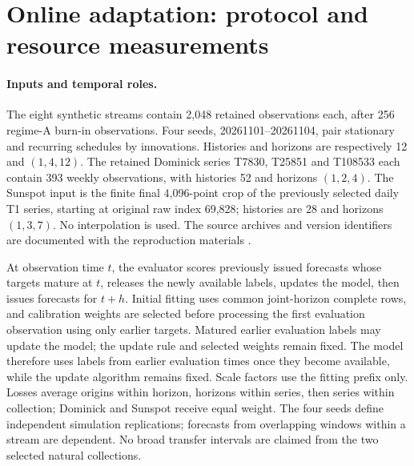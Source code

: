 \section{Online adaptation: protocol and resource measurements}
\label{app:adaptive-development}

\paragraph{Inputs and temporal roles.}
The eight synthetic streams contain 2,048 retained observations each, after
256 regime-A burn-in observations. Four seeds, 20261101--20261104, pair
stationary and recurring schedules by innovations. Histories and horizons
are respectively 12 and $(1,4,12)$. The retained Dominick series T7830,
T25851 and T108533 each contain 393 weekly observations, with histories 52
and horizons $(1,2,4)$. The Sunspot input is the finite final 4,096-point
crop of the previously selected daily T1 series, starting at original raw
index 69,828; histories are 28 and horizons $(1,3,7)$. No interpolation is
used. The source archives and version identifiers are documented with the
reproduction materials \citep{Godahewa2021Monash}.

At observation time $t$, the evaluator scores previously issued forecasts
whose targets mature at $t$, releases the newly available labels, updates
the model, then issues forecasts for $t+h$. Initial fitting uses common
joint-horizon complete rows, and calibration weights are selected before
processing the first evaluation observation using only earlier targets.
Matured earlier evaluation labels may update the model; the update rule and
selected weights remain fixed. The model therefore uses labels from earlier evaluation times once
they become available, while the update algorithm remains fixed. Scale factors use the fitting
prefix only. Losses average origins within horizon, horizons within series,
then series within collection; Dominick and Sunspot receive equal weight.
The four seeds define independent simulation replications; forecasts
from overlapping windows within a stream are dependent. No broad transfer intervals
are claimed from the two selected natural collections.

